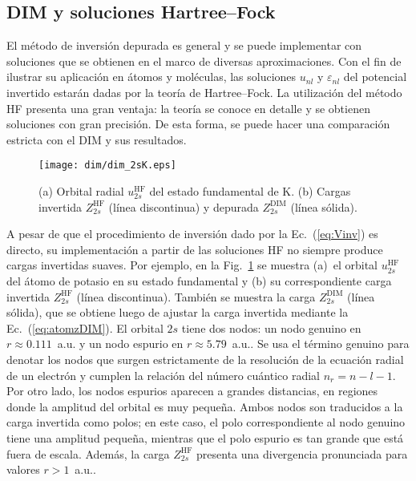 \subsection{DIM y soluciones Hartree--Fock}
\label{subsec:invHF}

El método de inversión depurada es general y se puede implementar con 
soluciones que se obtienen en el marco de diversas aproximaciones. Con 
el fin de ilustrar su aplicación en átomos y moléculas, las soluciones 
$u_{nl}$ y $\varepsilon_{nl}$ del potencial invertido estarán dadas por 
la teoría de Hartree--Fock. La utilización del método HF presenta una 
gran ventaja: la teoría se conoce en detalle y se obtienen soluciones 
con gran precisión. De esta forma, se puede hacer una comparación 
estricta con el DIM y sus resultados.

\begin{figure}[t]
\centering
\texttt{[image: dim/dim\_2sK.eps]} 
\caption[Orbital radial y carga efectiva correspondiente.]
{(a) Orbital radial $u_{2s}^{\mathrm{HF}}$ del estado fundamental de K.
(b) Cargas invertida $Z_{2s}^{\mathrm{HF}}$ (línea discontinua) 
y depurada $Z_{2s}^{\mathrm{DIM}}$ (línea sólida).}
\label{fig:2sK}
\end{figure}

A pesar de que el procedimiento de inversión dado por la 
Ec.~(\ref{eq:Vinv}) es directo, su implementación a partir de las 
soluciones HF no siempre produce cargas invertidas suaves. Por ejemplo,
en la Fig.~\ref{fig:2sK} se muestra (a)~el orbital $u_{2s}^{\mathrm{HF}}$ 
del átomo de potasio en su estado fundamental y (b) su correspondiente 
carga invertida $Z_{2s}^{\mathrm{HF}}$ (línea discontinua). También se 
muestra la carga $Z_{2s}^{\mathrm{DIM}}$ (línea sólida), que se obtiene 
luego de ajustar la carga invertida mediante la Ec.~(\ref{eq:atomzDIM}). 
El orbital $2s$ tiene dos nodos: un nodo genuino en $r\approx 0.111$~a.u. 
y un nodo espurio en \mbox{$r\approx 5.79$~a.u.}. Se usa el término 
genuino para denotar los nodos que surgen estrictamente de la resolución 
de la ecuación radial de un electrón y cumplen la relación del número 
cuántico radial $n_r=n-l-1$. Por otro lado, los nodos espurios aparecen 
a grandes distancias, en regiones donde la amplitud del orbital es muy 
pequeña. Ambos nodos son traducidos a la carga invertida como polos; en 
este caso, el polo correspondiente al nodo genuino tiene una amplitud 
pequeña, mientras que el polo espurio es tan grande que está fuera de 
escala. Además, la carga $Z_{2s}^{\mathrm{HF}}$ presenta una divergencia 
pronunciada para valores $r>1$~a.u.. 

